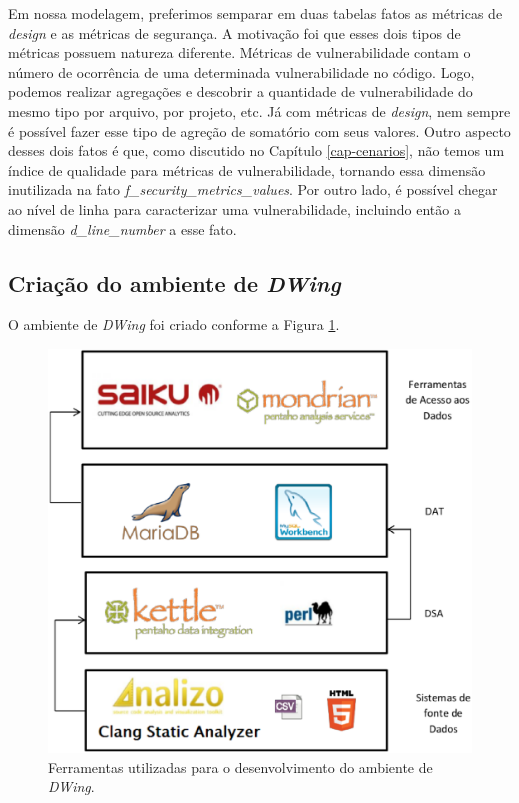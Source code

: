 Em nossa modelagem, preferimos semparar em duas tabelas fatos as métricas de \emph{design} e as métricas de segurança. A motivação foi que esses dois tipos de métricas possuem natureza diferente. Métricas de vulnerabilidade contam o número de ocorrência de uma determinada vulnerabilidade no código. Logo, podemos realizar agregações e descobrir a quantidade de vulnerabilidade do mesmo tipo por arquivo, por projeto, etc. Já com métricas de \emph{design}, nem sempre é possível fazer esse tipo de agreção de somatório com seus valores. Outro aspecto desses dois fatos é que, como discutido no Capítulo \ref{cap-cenarios}, não temos um índice de qualidade para métricas de vulnerabilidade, tornando essa dimensão inutilizada na fato \emph{f\_security\_metrics\_values}. Por outro lado, é possível chegar ao nível de linha para caracterizar uma vulnerabilidade, incluindo então a dimensão \emph{d\_line\_number} a esse fato.



\subsection{Criação do ambiente de \emph{DWing}}

O ambiente de \emph{DWing} foi criado conforme a Figura \ref{dw_components}.

 \begin{figure}[H]
 	\centering
 		\includegraphics[scale=0.5]{figuras/dw_components}
 		\caption{Ferramentas utilizadas para o desenvolvimento do ambiente de \emph{DWing}.}
 		\label{dw_components}
 \end{figure}


